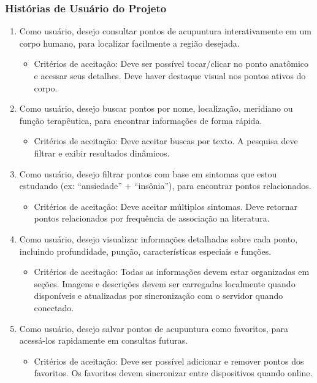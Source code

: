 \subsubsection{Histórias de Usuário do Projeto}

\begin{enumerate}
    \item Como usuário, desejo consultar pontos de acupuntura interativamente em um corpo humano, para localizar facilmente a região desejada.
    \begin{itemize}
        \item Critérios de aceitação: Deve ser possível tocar/clicar no ponto anatômico e acessar seus detalhes. Deve haver destaque visual nos pontos ativos do corpo.
    \end{itemize}
    
    \item Como usuário, desejo buscar pontos por nome, localização, meridiano ou função terapêutica, para encontrar informações de forma rápida.
    \begin{itemize}
        \item Critérios de aceitação: Deve aceitar buscas por texto. A pesquisa deve filtrar e exibir resultados dinâmicos.
    \end{itemize}
    
    \item Como usuário, desejo filtrar pontos com base em sintomas que estou estudando (ex: ``ansiedade'' + ``insônia''), para encontrar pontos relacionados.
    \begin{itemize}
        \item Critérios de aceitação: Deve aceitar múltiplos sintomas. Deve retornar pontos relacionados por frequência de associação na literatura.
    \end{itemize}
    
    \item Como usuário, desejo visualizar informações detalhadas sobre cada ponto, incluindo profundidade, punção, características especiais e funções.
    \begin{itemize}
        \item Critérios de aceitação: Todas as informações devem estar organizadas em seções. Imagens e descrições devem ser carregadas localmente quando disponíveis e atualizadas por sincronização com o servidor quando conectado.
    \end{itemize}
    
    \item Como usuário, desejo salvar pontos de acupuntura como favoritos, para acessá-los rapidamente em consultas futuras.
    \begin{itemize}
        \item Critérios de aceitação: Deve ser possível adicionar e remover pontos dos favoritos. Os favoritos devem sincronizar entre dispositivos quando online.
    \end{itemize}
    

\end{enumerate}

